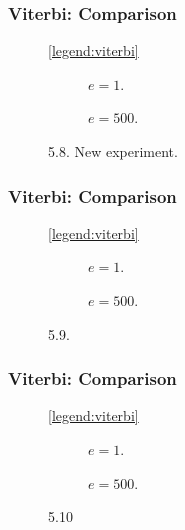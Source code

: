 \documentclass[english,notes]{beamer}
\begin{document}
\begin{frame}
  \frametitle{Viterbi: Comparison}
  \begin{figure}
    \centering\ref{legend:viterbi}\\
    \begin{subfigure}{0.5\textwidth}
      \centering 
      \caption{$e = 1$.}
    \end{subfigure}\hspace{-5mm}%
    \begin{subfigure}{0.5\textwidth}
      \centering 
      \caption{$e = 500$.}
    \end{subfigure}
    \caption{5.8. New experiment.}
  \end{figure}
\end{frame}

\begin{frame}
  \frametitle{Viterbi: Comparison}
  \begin{figure}
    \centering\ref{legend:viterbi}\\
    \begin{subfigure}{0.5\textwidth}
      \centering 
      \caption{$e = 1$.}
    \end{subfigure}\hspace{-5mm}%
    \begin{subfigure}{0.5\textwidth}
      \centering 
      \caption{$e=500$.}
    \end{subfigure}
    \caption{5.9.}
  \end{figure}
\end{frame}

\begin{frame}
  \frametitle{Viterbi: Comparison}
  \begin{figure}
    \centering\ref{legend:viterbi}\\
    \begin{subfigure}[b]{0.5\textwidth}
      \centering 
      \caption{$e = 1$.}
    \end{subfigure}\hspace{-5mm}%
    \begin{subfigure}[b]{0.5\textwidth}
      \centering
      
      \caption{$e = 500$.}
    \end{subfigure}
    \caption{5.10}
  \end{figure}
\end{frame}
\end{document}
